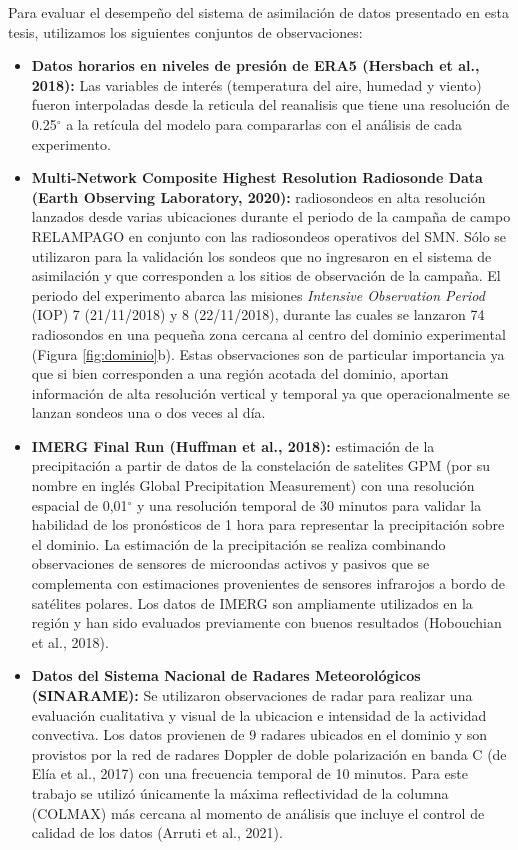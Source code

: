 \documentclass[12pt,oneside,a4paper]{reedthesis}
\begin{document}
Para evaluar el desempeño del sistema de asimilación de datos presentado en esta tesis, utilizamos los siguientes conjuntos de observaciones:
\begin{itemize}
\item
  \textbf{Datos horarios en niveles de presión de ERA5 (Hersbach et al., 2018):} Las variables de interés (temperatura del aire, humedad y viento) fueron interpoladas desde la reticula del reanalisis que tiene una resolución de 0.25\(^{\circ}\) a la retícula del modelo para compararlas con el análisis de cada experimento.
\item
  \textbf{Multi-Network Composite Highest Resolution Radiosonde Data (Earth Observing Laboratory, 2020):} radiosondeos en alta resolución lanzados desde varias ubicaciones durante el periodo de la campaña de campo RELAMPAGO en conjunto con las radiosondeos operativos del SMN. Sólo se utilizaron para la validación los sondeos que no ingresaron en el sistema de asimilación y que corresponden a los sitios de observación de la campaña. El periodo del experimento abarca las misiones \emph{Intensive Observation Period} (IOP) 7 (21/11/2018) y 8 (22/11/2018), durante las cuales se lanzaron 74 radiosondos en una pequeña zona cercana al centro del dominio experimental (Figura \ref{fig:dominio}b). Estas observaciones son de particular importancia ya que si bien corresponden a una región acotada del dominio, aportan información de alta resolución vertical y temporal ya que operacionalmente se lanzan sondeos una o dos veces al día.
\item
  \textbf{IMERG Final Run (Huffman et al., 2018):} estimación de la precipitación a partir de datos de la constelación de satelites GPM (por su nombre en inglés Global Precipitation Measurement) con una resolución espacial de 0,01\(^{\circ}\) y una resolución temporal de 30 minutos para validar la habilidad de los pronósticos de 1 hora para representar la precipitación sobre el dominio. La estimación de la precipitación se realiza combinando observaciones de sensores de microondas activos y pasivos que se complementa con estimaciones provenientes de sensores infrarojos a bordo de satélites polares. Los datos de IMERG son ampliamente utilizados en la región y han sido evaluados previamente con buenos resultados (Hobouchian et al., 2018).
\item
  \textbf{Datos del Sistema Nacional de Radares Meteorológicos (SINARAME):} Se utilizaron observaciones de radar para realizar una evaluación cualitativa y visual de la ubicacion e intensidad de la actividad convectiva. Los datos provienen de 9 radares ubicados en el dominio y son provistos por la red de radares Doppler de doble polarización en banda C (de Elía et al., 2017) con una frecuencia temporal de 10 minutos. Para este trabajo se utilizó únicamente la máxima reflectividad de la columna (COLMAX) más cercana al momento de análisis que incluye el control de calidad de los datos (Arruti et al., 2021).

\end{itemize}
\end{document}
